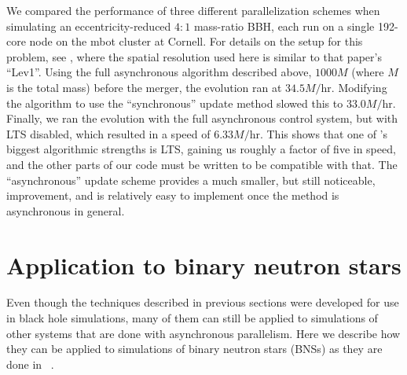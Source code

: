 \begin{bibunit}[unsrtnat]
{We compared the performance of three different parallelization schemes when
simulating an eccentricity-reduced $4:1$ mass-ratio BBH, each run on a single
192-core node on the mbot cluster at Cornell.  For details on the setup for
this problem, see \cite{Lovelace:2024wra}, where the spatial resolution used
here is similar to that paper's ``Lev1''.  Using the full asynchronous
algorithm described above, $1000 M$ (where $M$ is the total mass) before the
merger, the evolution ran at $34.5 M/\mathrm{hr}$.  Modifying the algorithm to
use the ``synchronous'' update method slowed this to $33.0 M/\mathrm{hr}$.
Finally, we ran the evolution with the full asynchronous control system, but
with LTS disabled, which resulted in a speed of $6.33 M/\mathrm{hr}$.  This
shows that one of \spectre's biggest algorithmic strengths is LTS, gaining us
roughly a factor of five in speed, and the other parts of our code must be written
to be compatible with that.  The ``asynchronous'' update scheme provides a much
smaller, but still noticeable, improvement, and is relatively easy to implement
once the method is asynchronous in general.
}

\section{Application to binary neutron stars\label{sec:bns}}

Even though the techniques described in previous sections were developed for use
in black hole simulations, many of them can still be applied to simulations of
other systems that are done with asynchronous parallelism. Here we describe how
they can be applied to simulations of binary neutron stars (BNSs) as they are
done in \spectre~\cite{Deppe:2024ckt}.



\end{bibunit}
